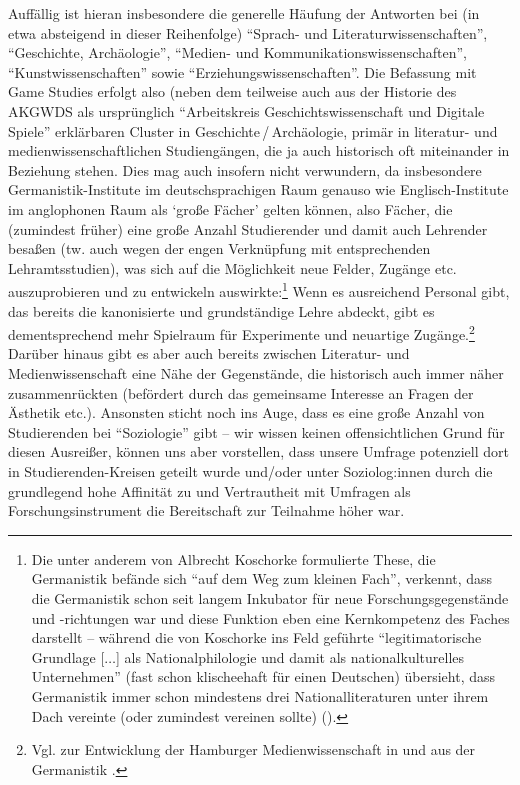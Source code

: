 \documentclass{scrartcl}
\begin{document}
Auffällig ist hieran insbesondere die generelle Häufung der Antworten bei (in etwa absteigend in dieser Reihenfolge) \enquote{Sprach- und Literaturwissenschaften}, \enquote{Geschichte, Archäologie}, \enquote{Medien- und Kommunikationswissenschaften}, \enquote{Kunstwissenschaften} sowie \enquote{Erziehungswissenschaften}.
Die Befassung mit Game Studies erfolgt also (neben dem teilweise auch aus der Historie des AKGWDS als ursprünglich \enquote{Arbeitskreis Geschichtswissenschaft und Digitale Spiele} erklärbaren Cluster in Geschichte\,/\,Archäologie, primär in literatur- und medienwissenschaftlichen Studiengängen, die ja auch historisch oft miteinander in Beziehung stehen.
Dies mag auch insofern nicht verwundern, da insbesondere Germanistik-Institute im deutschsprachigen Raum genauso wie Englisch-Institute im anglophonen Raum als \enquote*{große Fächer} gelten können, also Fächer, die (zumindest früher) eine große Anzahl Studierender und damit auch Lehrender besaßen (tw. auch wegen der engen Verknüpfung mit entsprechenden Lehramtsstudien), was sich auf die Möglichkeit neue Felder, Zugänge etc. auszuprobieren und zu entwickeln auswirkte:\footnote{Die unter anderem von Albrecht Koschorke formulierte These, die Germanistik befände sich \enquote{auf dem Weg zum kleinen Fach}, verkennt, dass die Germanistik schon seit langem Inkubator für neue Forschungsgegenstände und -richtungen war und diese Funktion eben eine Kernkompetenz des Faches darstellt -- während die von Koschorke ins Feld geführte \enquote{legitimatorische Grundlage [$\ldots$] als Nationalphilologie und damit als nationalkulturelles Unternehmen} (fast schon klischeehaft für einen Deutschen) übersieht, dass Germanistik immer schon mindestens drei Nationalliteraturen unter ihrem Dach vereinte (oder zumindest vereinen sollte) (\autocite[vgl.][S.~590]{koschorke_germanistik_2015}).}
Wenn es ausreichend Personal gibt, das bereits die kanonisierte und grundständige Lehre abdeckt, gibt es dementsprechend mehr Spielraum für Experimente und neuartige Zugänge.\footnote{Vgl. zur Entwicklung der Hamburger Medienwissenschaft in und aus der Germanistik \autocite[][S.~35–56]{hickethier_binnendifferenzierung_2000}.}
Darüber hinaus gibt es aber auch bereits zwischen Literatur- und Medienwissenschaft eine Nähe der Gegenstände, die historisch auch immer näher zusammenrückten (befördert durch das gemeinsame Interesse an Fragen der Ästhetik etc.).
Ansonsten sticht noch ins Auge, dass es eine große Anzahl von Studierenden bei \enquote{Soziologie} gibt -- wir wissen keinen offensichtlichen Grund für diesen Ausreißer, können uns aber vorstellen, dass unsere Umfrage potenziell dort in Studierenden-Kreisen geteilt wurde und/oder unter Soziolog:innen durch die grundlegend hohe Affinität zu und Vertrautheit mit Umfragen als Forschungsinstrument die Bereitschaft zur Teilnahme höher war.
\end{document}
